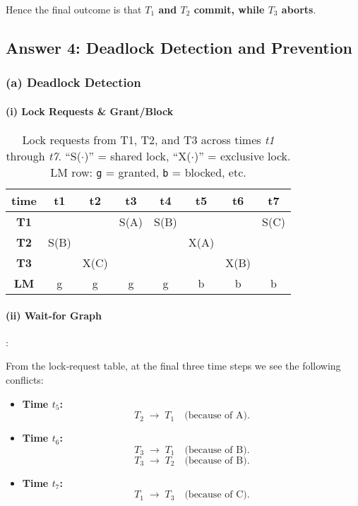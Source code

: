 \documentclass[11pt]{article}
\begin{document}
\noindent
Hence the final outcome is that \textbf{$T_1$ and $T_2$ commit, while $T_3$ aborts}.
\subsection*{Answer 4: Deadlock Detection and Prevention}

\subsubsection*{(a) \; Deadlock Detection}

\paragraph{(i) Lock Requests \& Grant/Block}
\begin{table}[!ht]
\centering
\begin{tabular}{c|ccccccc}
\textbf{time} & \textbf{t1} & \textbf{t2} & \textbf{t3} & \textbf{t4} & \textbf{t5} & \textbf{t6} & \textbf{t7} \\
\hline
\textbf{T1} &  &  & S(A) & S(B) &  &  & S(C) \\
\textbf{T2} & S(B) &  &  &  & X(A) &  &  \\
\textbf{T3} &  & X(C) & &  &  & X(B) &  \\
\hline
\textbf{LM} & g & g & g & g & b & b & b \\
\end{tabular}
\caption{Lock requests from T1, T2, and T3 across times \textit{t1} through \textit{t7}. 
``S($\cdot$)'' = shared lock, ``X($\cdot$)'' = exclusive lock. 
LM row: \texttt{g} = granted, \texttt{b} = blocked, etc.}
\end{table}

\paragraph{(ii) Wait-for Graph}:

From the lock‐request table, at the final three time steps we see the following conflicts:

\begin{itemize}
  \item \textbf{Time $t_5$:} 
    \[
      T_2 \;\longrightarrow\; T_1 \quad\text{(because of A).}
    \]

  \item \textbf{Time $t_6$:} 
    \[
      T_3 \;\longrightarrow\; T_1 \quad\text{(because of B).}
    \]
    \[
    T_3 \;\longrightarrow\; T_2 \quad\text{(because of B).}
    \]

  \item \textbf{Time $t_7$:} 
    \[
      T_1 \;\longrightarrow\; T_3 \quad\text{(because of C).}
    \]
\end{itemize}
\end{document}
